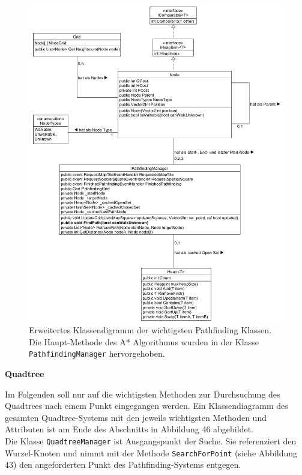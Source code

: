\documentclass[a4paper,12pt]{article}
\newcommand{\code}{\texttt}
\begin{document}
\begin{figure}[H]
    \centering
    \includegraphics[width=1\linewidth]{Bilder/Aufgabe3/Teilaufgabe_C/Klassendiagramm_Pathfinding.png}
    \caption{Erweitertes Klassendigramm der wichtigsten Pathfinding Klassen. Die Haupt-Methode des A* Algorithmus wurden in der Klasse \code{PathfindingManager} hervorgehoben.}
\end{figure}

\textbf{Quadtree}

Im Folgenden soll nur auf die wichtigsten Methoden zur Durchsuchung des Quadtrees nach einem Punkt eingegangen werden. Ein Klassendiagramm des gesamten Quadtree-Systems mit den jeweils wichtigsten Methoden und Attributen ist am Ende des Abschnitts in Abbildung 46 abgebildet.
\\[0.4cm]
Die Klasse \code{QuadtreeManager} ist Ausgangspunkt der Suche. Sie referenziert den Wurzel-Knoten und nimmt mit der Methode \code{SearchForPoint} (siehe Abbildung 43) den angeforderten Punkt des Pathfinding-Systems entgegen.
\end{document}
